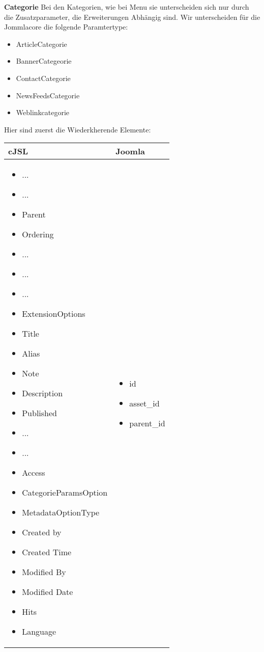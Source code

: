 \textbf{Categorie}
Bei den Kategorien, wie bei Menu sie unterscheiden sich nur durch die Zusatzparameter, die Erweiterungen Abhängig sind. Wir unterscheiden für die Jommlacore die folgende Paramtertype:
\begin{itemize}
\item ArticleCategorie
\item BannerCategeorie
\item ContactCategorie
\item NewsFeedsCategorie
\item Weblinkcategorie 
\end{itemize}
 Hier sind zuerst die Wiederkherende Elemente:
 
\begin{minipage}{0.7\textwidth}
\begin{tabular}{|p{} | p{}|}
\hline
\textbf{cJSL} & \textbf{Joomla} \\ 
\hline
\begin{itemize}
\item ...
\item ...
\item Parent
\item Ordering
\item ...
\item ...
\item ...
\item  ExtensionOptions
\item  Title
\item  Alias
\item  Note
\item  Description
\item  Published
\item  ...
\item  ...
\item  Access
\item  CategorieParamsOption
\item  MetadataOptionType
\item  Created by
\item  Created Time
\item  Modified By
\item  Modified Date
\item  Hits
\item  Language
\end{itemize}
 & 
\begin{itemize}
\item id
\item asset\_id
\item parent\_id

\end{itemize}
\end{tabular}
\end{minipage}
